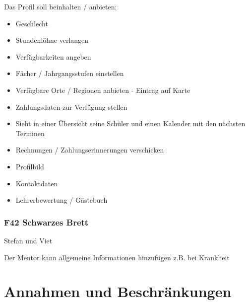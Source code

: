 \documentclass[10pt,a4paper]{scrartcl}
\begin{document}
Das Profil soll beinhalten / anbieten:
\begin{itemize}
	\item Geschlecht
	\item Stundenlöhne verlangen
	\item Verfügbarkeiten angeben
	\item Fächer / Jahrgangsstufen einstellen
	\item Verfügbare Orte / Regionen anbieten - Eintrag auf Karte
	\item Zahlungsdaten zur Verfügung stellen
	\item Sieht in einer Übersicht seine Schüler und einen Kalender mit den nächsten Terminen
	\item Rechnungen / Zahlungserinnerungen verschicken
	\item Profilbild
	\item Kontaktdaten
	\item Lehrerbewertung / Gästebuch
\end{itemize}

% 
% 
% 
% 

\subsubsection*{F42 Schwarzes Brett}

Stefan und Viet

Der Mentor kann allgemeine Informationen hinzufügen z.B. bei Krankheit


\section{Annahmen und Beschränkungen}
\end{document}

